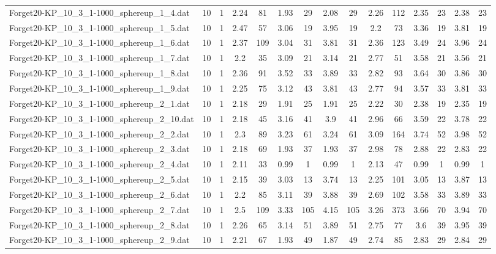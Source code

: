 \begin{table}[!ht]
{\begin{tabular}{lcccccccccccccc}
Forget20-KP\_10\_3\_1-1000\_sphereup\_1\_4.dat & 10 & 1 & 2.24 & 81 & 1.93 & 29 & 2.08 & 29 & 2.26 & 112 & 2.35 & 23 & 2.38 & 23 \\
Forget20-KP\_10\_3\_1-1000\_sphereup\_1\_5.dat & 10 & 1 & 2.47 & 57 & 3.06 & 19 & 3.95 & 19 & 2.2 & 73 & 3.36 & 19 & 3.81 & 19 \\
Forget20-KP\_10\_3\_1-1000\_sphereup\_1\_6.dat & 10 & 1 & 2.37 & 109 & 3.04 & 31 & 3.81 & 31 & 2.36 & 123 & 3.49 & 24 & 3.96 & 24 \\
Forget20-KP\_10\_3\_1-1000\_sphereup\_1\_7.dat & 10 & 1 & 2.2 & 35 & 3.09 & 21 & 3.14 & 21 & 2.77 & 51 & 3.58 & 21 & 3.56 & 21 \\
Forget20-KP\_10\_3\_1-1000\_sphereup\_1\_8.dat & 10 & 1 & 2.36 & 91 & 3.52 & 33 & 3.89 & 33 & 2.82 & 93 & 3.64 & 30 & 3.86 & 30 \\
Forget20-KP\_10\_3\_1-1000\_sphereup\_1\_9.dat & 10 & 1 & 2.25 & 75 & 3.12 & 43 & 3.81 & 43 & 2.77 & 94 & 3.57 & 33 & 3.81 & 33 \\
Forget20-KP\_10\_3\_1-1000\_sphereup\_2\_1.dat & 10 & 1 & 2.18 & 29 & 1.91 & 25 & 1.91 & 25 & 2.22 & 30 & 2.38 & 19 & 2.35 & 19 \\
Forget20-KP\_10\_3\_1-1000\_sphereup\_2\_10.dat & 10 & 1 & 2.18 & 45 & 3.16 & 41 & 3.9 & 41 & 2.96 & 66 & 3.59 & 22 & 3.78 & 22 \\
Forget20-KP\_10\_3\_1-1000\_sphereup\_2\_2.dat & 10 & 1 & 2.3 & 89 & 3.23 & 61 & 3.24 & 61 & 3.09 & 164 & 3.74 & 52 & 3.98 & 52 \\
Forget20-KP\_10\_3\_1-1000\_sphereup\_2\_3.dat & 10 & 1 & 2.18 & 69 & 1.93 & 37 & 1.93 & 37 & 2.98 & 78 & 2.88 & 22 & 2.83 & 22 \\
Forget20-KP\_10\_3\_1-1000\_sphereup\_2\_4.dat & 10 & 1 & 2.11 & 33 & 0.99 & 1 & 0.99 & 1 & 2.13 & 47 & 0.99 & 1 & 0.99 & 1 \\
Forget20-KP\_10\_3\_1-1000\_sphereup\_2\_5.dat & 10 & 1 & 2.15 & 39 & 3.03 & 13 & 3.74 & 13 & 2.25 & 101 & 3.05 & 13 & 3.87 & 13 \\
Forget20-KP\_10\_3\_1-1000\_sphereup\_2\_6.dat & 10 & 1 & 2.2 & 85 & 3.11 & 39 & 3.88 & 39 & 2.69 & 102 & 3.58 & 33 & 3.89 & 33 \\
Forget20-KP\_10\_3\_1-1000\_sphereup\_2\_7.dat & 10 & 1 & 2.5 & 109 & 3.33 & 105 & 4.15 & 105 & 3.26 & 373 & 3.66 & 70 & 3.94 & 70 \\
Forget20-KP\_10\_3\_1-1000\_sphereup\_2\_8.dat & 10 & 1 & 2.26 & 65 & 3.14 & 51 & 3.89 & 51 & 2.75 & 77 & 3.6 & 39 & 3.95 & 39 \\
Forget20-KP\_10\_3\_1-1000\_sphereup\_2\_9.dat & 10 & 1 & 2.21 & 67 & 1.93 & 49 & 1.87 & 49 & 2.74 & 85 & 2.83 & 29 & 2.84 & 29 \\

\end{tabular}}
\end{table}
